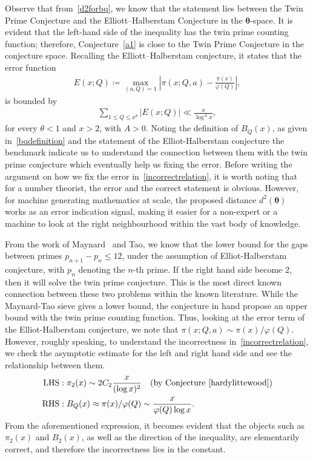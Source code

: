 \documentclass[11pt,reqno]{amsart}
\theoremstyle{plain}\newtheorem{theorem}{Theorem}[section]
\numberwithin{equation}{section}
\begin{document}
\medskip
\noindent
Observe that from~\eqref{d2forbq}, we know that the statement lies between the Twin Prime Conjecture and the Elliott–Halberstam Conjecture in the $\bm{\theta}$-space. It is evident that the left-hand side of the inequality has the twin prime counting function; therefore, Conjecture~\ref{a1} is close to the Twin Prime Conjecture in the conjecture space. Recalling the Elliott–Halberstam conjecture, it states that the error function
\begin{align*}
E(x;Q)
\coloneqq \max_{(a,Q)=1} \left|\pi(x;Q,a)-\frac{\pi(x)}{\varphi(Q)}\right|,
\end{align*}
is bounded by
\begin{align*}
\sum_{1\leq Q\leq x^{\theta}}|E(x;Q)|\ll \frac{x}{\log^A x},
\end{align*}
for every $\theta<1$ and $x>2$, with $A>0$. Noting the definition of $B_Q(x)$, as given in~\eqref{bqdefinition} and the statement of the Elliot-Halberstam conjecture the benchmark indicate us to understand the connection between them with the twin prime conjecture which eventually help us fixing the error. Before writing the argument on how we fix the error in~\eqref{incorrectrelation}, it is worth noting that for a number theorist, the error and the correct statement is obvious. However, for machine generating mathematics at scale, the proposed distance $d^2(\bm{\theta})$ works as an error indication signal, making it easier for a non-expert or a machine to look at the right neighbourhood within the vast body of knowledge.

\medskip
\noindent
From the work of Maynard~\cite{James2} and Tao, we know that the lower bound for the gaps between primes $p_{n+1}-p_n\leq 12$, under the assumption of Elliot-Halberstam conjecture, with $p_n$ denoting the $n$-th prime. If the right hand side become 2, then it will solve the twin prime conjecture. This is the most direct known connection between these two problems within the known literature. While the Maynard-Tao sieve gives a lower bound, the conjecture in hand propose an upper bound with the twin prime counting function. Thus, looking at the error term of the Elliot-Halberstam conjecture, we note that $\pi(x;Q,a)\sim \pi(x)/\varphi(Q)$. However, roughly speaking, to understand the incorrectness in~\eqref{incorrectrelation}, we check the asymptotic estimate for the left and right hand side and see the relationship between them.
\begin{align*}
\mathrm{LHS:}& \;\pi_2(x)\sim 2C_2\frac{x}{(\log x)^2}\quad (\text{by Conjecture~\ref{hardylittewood}})\\
\mathrm{RHS:}& \; B_Q(x)\approx\pi(x)/\varphi(Q)\sim \frac{x}{\varphi(Q)\log x}.
\end{align*}
\noindent
From the aforementioned expression, it becomes evident that the objects such as $\pi_2(x)$ and $B_2(x)$, as well as the direction of the inequality, are elementarily correct, and therefore the incorrectness lies in the constant.
\end{document}
